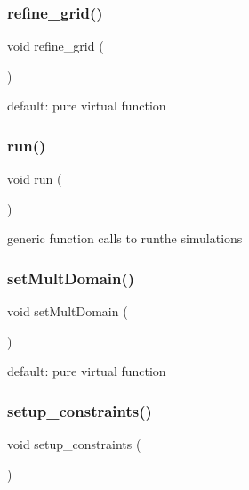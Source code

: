 \subsubsection{\texorpdfstring{refine\_grid()}{refine\_grid()}}
{\footnotesize\ttfamily void refine\+\_\+grid (\begin{DoxyParamCaption}{ }\end{DoxyParamCaption})\hspace{0.3cm}{\ttfamily [virtual]}}

default\+: pure virtual function \mbox{\label{classinit_bound_val_probs_a13a43e6d814de94978c515cb084873b1}} 
\subsubsection{\texorpdfstring{run()}{run()}}
{\footnotesize\ttfamily void run (\begin{DoxyParamCaption}{ }\end{DoxyParamCaption})\hspace{0.3cm}{\ttfamily [virtual]}}

generic function calls to runthe simulations \mbox{\label{classinit_bound_val_probs_a5fb25d0981afa1f7d87875fffcc272c1}} 
\subsubsection{\texorpdfstring{setMultDomain()}{setMultDomain()}}
{\footnotesize\ttfamily void set\+Mult\+Domain (\begin{DoxyParamCaption}{ }\end{DoxyParamCaption})\hspace{0.3cm}{\ttfamily [virtual]}}

default\+: pure virtual function \mbox{\label{classinit_bound_val_probs_a97967f7bc5aba9a2158464d2de9d2352}} 
\subsubsection{\texorpdfstring{setup\_constraints()}{setup\_constraints()}}
{\footnotesize\ttfamily void setup\+\_\+constraints (\begin{DoxyParamCaption}{ }\end{DoxyParamCaption})\hspace{0.3cm}{\ttfamily [virtual]}}

